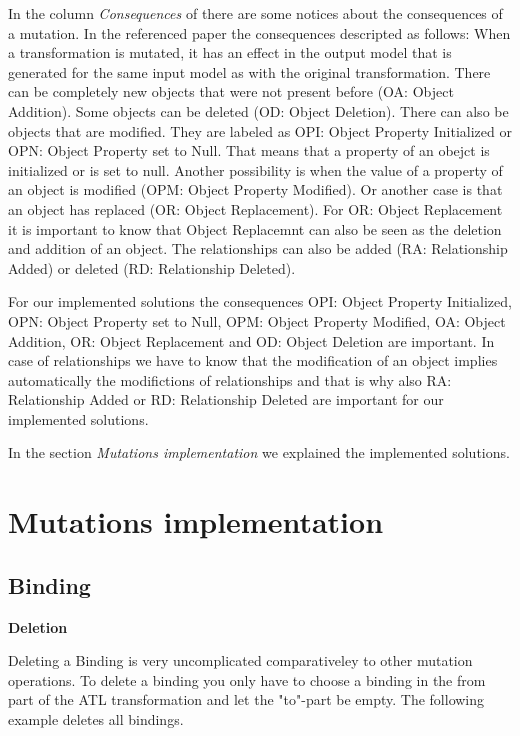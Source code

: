 \documentclass{llncs}
\begin{document}
In the column \textit{Consequences} of
\label{fig:mutations_ATL} there are some notices about the
consequences of a mutation. In the referenced paper \cite{troya:2015} the
consequences descripted as follows:
When a transformation is mutated, it has an effect in the output model that is
generated for the same input model as with the original
transformation. 
There can be completely new objects that were not present before (OA: Object
Addition). Some objects can be deleted (OD: Object Deletion). There can also be
objects that are modified. They are labeled as OPI: Object Property
Initialized or OPN: Object Property set to Null. That means that a property of
an obejct is initialized or is set to null. Another possibility is when the
value of a property of an object is modified (OPM:
Object Property Modified). Or another case is
that an object has replaced (OR: Object Replacement). For OR: Object
Replacement it is important to know that Object Replacemnt can also be seen as
the deletion and addition of an object. The relationships can also be added (RA:
Relationship Added) or deleted (RD: Relationship Deleted).\cite{troya:2015}

For our implemented solutions the consequences OPI: Object Property
Initialized, OPN: Object Property set to Null, OPM:
Object Property Modified, OA: Object
Addition, OR: Object Replacement and OD: Object Deletion are important. In case
of relationships we have to know that the modification of an object implies
automatically the modifictions of relationships and that is why also RA:
Relationship Added or RD: Relationship Deleted are important for our implemented
solutions.

In the section \textit{Mutations implementation} we explained the implemented
solutions. 

\section{Mutations implementation}

\subsection{Binding}

\textbf{Deletion}

Deleting a Binding is very uncomplicated comparativeley to other mutation operations.
To delete a binding you only have to choose a binding in the from part of the ATL transformation and let the "to"-part be empty.
The following example deletes  all bindings.
\end{document}
